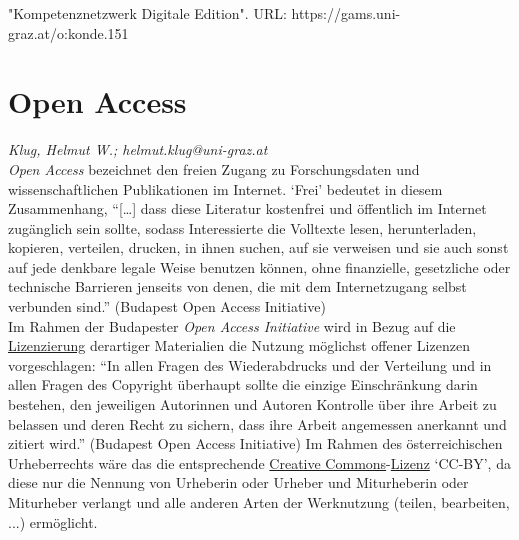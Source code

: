 \documentclass{article}
\begin{document}
"Kompetenznetzwerk Digitale Edition". URL: https://gams.uni-graz.at/o:konde.151\newpage\section*{Open Access} \emph{Klug, Helmut W.; helmut.klug@uni-graz.at }\\
        
    \emph{Open Access} bezeichnet den freien Zugang zu Forschungsdaten und wissenschaftlichen Publikationen im Internet. ‘Frei’ bedeutet in diesem Zusammenhang, “[…] dass diese Literatur kostenfrei und öffentlich im Internet zugänglich sein sollte, sodass Interessierte die Volltexte lesen, herunterladen, kopieren, verteilen, drucken, in ihnen suchen, auf sie verweisen und sie auch sonst auf jede denkbare legale Weise benutzen können, ohne finanzielle, gesetzliche oder technische Barrieren jenseits von denen, die mit dem Internetzugang selbst verbunden sind.” (Budapest Open Access Initiative)\\
            
        Im Rahmen der Budapester \emph{Open Access Initiative} wird in Bezug auf die \href{http://gams.uni-graz.at/o:konde.119}{Lizenzierung} derartiger Materialien die Nutzung möglichst offener Lizenzen vorgeschlagen: “In allen Fragen des Wiederabdrucks und der Verteilung und in allen Fragen des Copyright überhaupt sollte die einzige Einschränkung darin bestehen, den jeweiligen Autorinnen und Autoren Kontrolle über ihre Arbeit zu belassen und deren Recht zu sichern, dass ihre Arbeit angemessen anerkannt und zitiert wird.” (Budapest Open Access Initiative) Im Rahmen des österreichischen Urheberrechts wäre das die entsprechende \href{http://gams.uni-graz.at/o:konde.45}{Creative Commons}-\href{http://gams.uni-graz.at/o:konde.9}{Lizenz} ‘CC-BY’, da diese nur die Nennung von Urheberin oder Urheber und Miturheberin oder Miturheber verlangt und alle anderen Arten der Werknutzung (teilen, bearbeiten, ...) ermöglicht.\\
            
\end{document}
